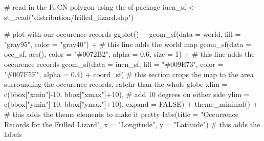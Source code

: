 \documentclass[
  letterpaper,
  DIV=11,
  numbers=noendperiod]{scrartcl}
\newenvironment{Shaded}{\begin{snugshade}}{\end{snugshade}}
\newcommand{\AttributeTok}[1]{\textcolor[rgb]{0.40,0.45,0.13}{#1}}
\newcommand{\CommentTok}[1]{\textcolor[rgb]{0.37,0.37,0.37}{#1}}
\newcommand{\ConstantTok}[1]{\textcolor[rgb]{0.56,0.35,0.01}{#1}}
\newcommand{\DecValTok}[1]{\textcolor[rgb]{0.68,0.00,0.00}{#1}}
\newcommand{\FloatTok}[1]{\textcolor[rgb]{0.68,0.00,0.00}{#1}}
\newcommand{\FunctionTok}[1]{\textcolor[rgb]{0.28,0.35,0.67}{#1}}
\newcommand{\NormalTok}[1]{\textcolor[rgb]{0.00,0.23,0.31}{#1}}
\newcommand{\OtherTok}[1]{\textcolor[rgb]{0.00,0.23,0.31}{#1}}
\newcommand{\SpecialCharTok}[1]{\textcolor[rgb]{0.37,0.37,0.37}{#1}}
\newcommand{\StringTok}[1]{\textcolor[rgb]{0.13,0.47,0.30}{#1}}
\begin{document}
\begin{Shaded}
\begin{Highlighting}[]
\CommentTok{\# read in the IUCN polygon using the sf package}
\NormalTok{iucn\_sf }\OtherTok{\textless{}{-}} \FunctionTok{st\_read}\NormalTok{(}\StringTok{"distribution/frilled\_lizard.shp"}\NormalTok{)}


\CommentTok{\# plot with our occurence records}
\FunctionTok{ggplot}\NormalTok{() }\SpecialCharTok{+}
  \FunctionTok{geom\_sf}\NormalTok{(}\AttributeTok{data =}\NormalTok{ world, }\AttributeTok{fill =} \StringTok{"gray95"}\NormalTok{, }\AttributeTok{color =} \StringTok{"gray40"}\NormalTok{) }\SpecialCharTok{+} \CommentTok{\# this line adds the world map}
  \FunctionTok{geom\_sf}\NormalTok{(}\AttributeTok{data =}\NormalTok{ occ\_sf, }\FunctionTok{aes}\NormalTok{(), }\AttributeTok{color =} \StringTok{"\#0072B2"}\NormalTok{, }\AttributeTok{alpha =} \FloatTok{0.6}\NormalTok{, }\AttributeTok{size =} \DecValTok{1}\NormalTok{) }\SpecialCharTok{+} \CommentTok{\# this line adds the occurence records}
  \FunctionTok{geom\_sf}\NormalTok{(}\AttributeTok{data =}\NormalTok{ iucn\_sf, }\AttributeTok{fill =} \StringTok{"\#009E73"}\NormalTok{, }\AttributeTok{color =} \StringTok{"\#007F5F"}\NormalTok{, }\AttributeTok{alpha =} \FloatTok{0.4}\NormalTok{) }\SpecialCharTok{+}
  \FunctionTok{coord\_sf}\NormalTok{( }\CommentTok{\# this section crops the map to the area surrounding the occurence records, ratehr than the whole globe}
    \AttributeTok{xlim =} \FunctionTok{c}\NormalTok{(bbox[}\StringTok{"xmin"}\NormalTok{]}\SpecialCharTok{{-}}\DecValTok{10}\NormalTok{, bbox[}\StringTok{"xmax"}\NormalTok{]}\SpecialCharTok{+}\DecValTok{10}\NormalTok{), }\CommentTok{\# add 10 degrees on either side }
    \AttributeTok{ylim =} \FunctionTok{c}\NormalTok{(bbox[}\StringTok{"ymin"}\NormalTok{]}\SpecialCharTok{{-}}\DecValTok{10}\NormalTok{, bbox[}\StringTok{"ymax"}\NormalTok{]}\SpecialCharTok{+}\DecValTok{10}\NormalTok{),}
    \AttributeTok{expand =} \ConstantTok{FALSE}\NormalTok{) }\SpecialCharTok{+}
  \FunctionTok{theme\_minimal}\NormalTok{() }\SpecialCharTok{+} \CommentTok{\# this adds the theme elements to make it pretty}
  \FunctionTok{labs}\NormalTok{(}\AttributeTok{title =} \StringTok{"Occurrence Records for the Frilled Lizard"}\NormalTok{, }\AttributeTok{x =} \StringTok{"Longitude"}\NormalTok{, }\AttributeTok{y =} \StringTok{"Latitude"}\NormalTok{) }\CommentTok{\# this adds the labels}
\end{Highlighting}
\end{Shaded}
\end{document}
